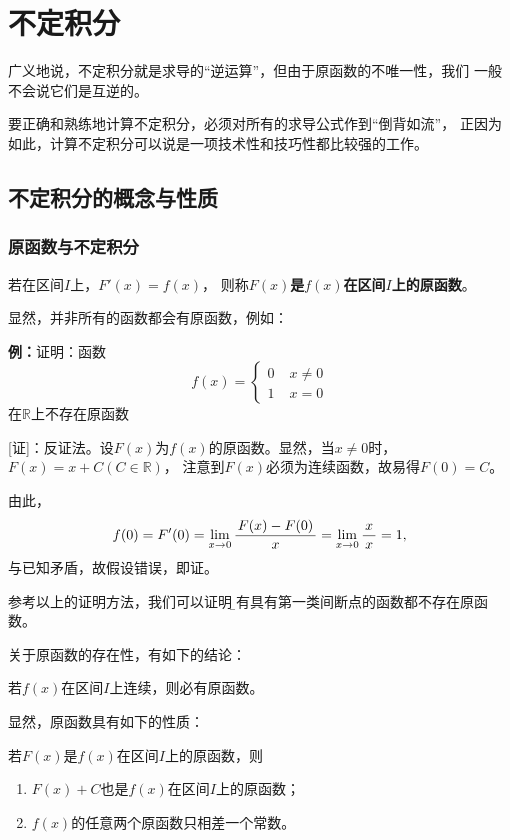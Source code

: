 \setcounter{chapter}{3}

\chapter{不定积分}

广义地说，不定积分就是求导的“逆运算”，但由于原函数的不唯一性，我们
一般不会说它们是互逆的。

要正确和熟练地计算不定积分，必须对所有的求导公式作到“倒背如流”，
正因为如此，计算不定积分可以说是一项技术性和技巧性都比较强的工作。

\section{不定积分的概念与性质}

\subsection{原函数与不定积分}

\begin{thx}
	若在区间$I$上，$F'(x)=f(x)$，
	则称{\bf $F(x)$是$f(x)$在区间$I$上的原函数}。
\end{thx}

显然，并非所有的函数都会有原函数，例如：

{\bf 例：}证明：函数$$f(x)=\left\{\begin{array}{ll}
0\;& x\ne 0\\1\;& x=0\end{array}\right.$$在$\mathbb{R}$上不存在原函数

[证]：反证法。设$F(x)$为$f(x)$的原函数。显然，当$x\ne0$时，$F(x)=x+C(C\in\mathbb{R})$，
注意到$F(x)$必须为连续函数，故易得$F(0)=C$。

由此，
$$f(0)=F'(0)=\lim\limits_{x\to{0}}\displaystyle\frac{\,{F(x)-F(0)}\,}{\,{x}\,}=\lim\limits_{x\to{0}}\displaystyle\frac{\,{x}\,}{\,{x}\,}=1,$$
与已知矛盾，故假设错误，即证。\fin

参考以上的证明方法，我们可以证明{\b 所有具有第一类间断点的函数都不存在原函数}。

关于原函数的存在性，有如下的结论：

\begin{thx}
	若$f(x)$在区间$I$上连续，则必有原函数。
\end{thx}

显然，原函数具有如下的性质：

\begin{thx}
	若$F(x)$是$f(x)$在区间$I$上的原函数，则
	\begin{enumerate}
	  \item $F(x)+C$也是$f(x)$在区间$I$上的原函数；
	  \item $f(x)$的任意两个原函数只相差一个常数。
	\end{enumerate}
\end{thx}

